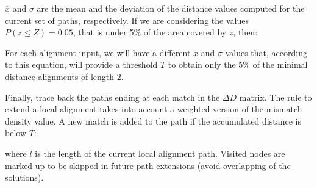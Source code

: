 \begin{menumerate}
$\overline{x}$ and $\sigma$ are the mean and the deviation of the distance values computed for 
the current set of paths, respectively. If we are considering the values $P(z \leq Z) = 0.05$,
that is under 5\% of the area covered by $z$, then:

\begin{center}
\end{center}

For each alignment input, we will have a different $\overline{x}$ and $\sigma$ values
that, according to this equation, will provide a threshold $T$ to obtain only the
5\% of the minimal distance alignments of length $2$.

\item
Finally, trace back the paths ending at each match in the $\Delta D$ matrix. The
rule to extend a local alignment takes into account a weighted version of the
mismatch density value. A new match is added to the path if the accumulated distance
is below $T$:

\begin{center}
\end{center}

where $l$ is the length of the current local alignment path. Visited nodes are marked up 
to be skipped in future path extensions (avoid overlapping of the solutions).
\end{menumerate}


